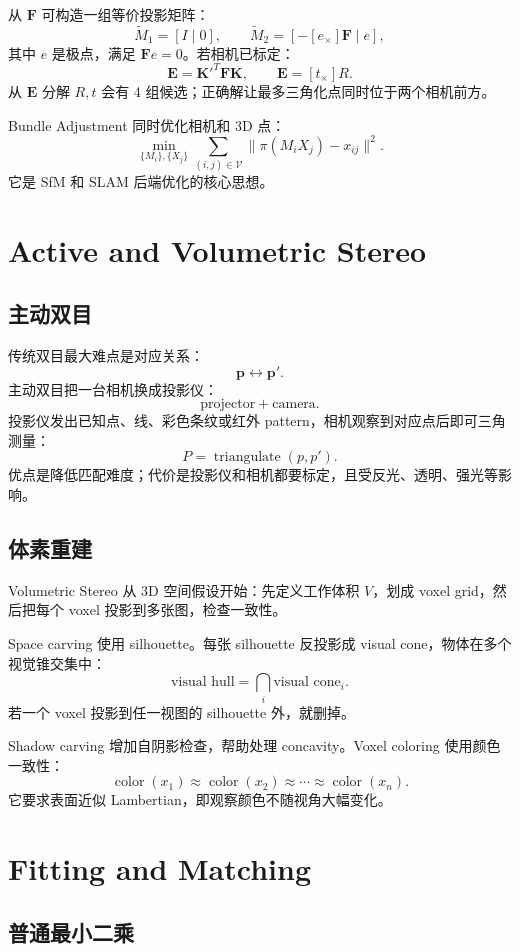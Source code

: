 \documentclass[11pt]{article}
\newcommand{\K}{\mathbf{K}}
\newcommand{\E}{\mathbf{E}}
\newcommand{\F}{\mathbf{F}}
\newcommand{\p}{\mathbf{p}}
\begin{document}
从 $\F$ 可构造一组等价投影矩阵：
\[
  \tilde M_1=[I\mid0],\qquad
  \tilde M_2=[-[e_\times]\F\mid e],
\]
其中 $e$ 是极点，满足 $\F e=0$。若相机已标定：
\[
  \E=\K'^T\F\K,\qquad
  \E=[t_\times]R.
\]
从 $\E$ 分解 $R,t$ 会有 4 组候选；正确解让最多三角化点同时位于两个相机前方。

Bundle Adjustment 同时优化相机和 3D 点：
\[
  \min_{\{M_i\},\{X_j\}}
  \sum_{(i,j)\in\mathcal V}
  \|\pi(M_iX_j)-x_{ij}\|^2.
\]
它是 SfM 和 SLAM 后端优化的核心思想。

\section{Active and Volumetric Stereo}

\subsection{主动双目}

传统双目最大难点是对应关系：
\[
  \p\leftrightarrow\p'.
\]
主动双目把一台相机换成投影仪：
\[
  \text{projector}+\text{camera}.
\]
投影仪发出已知点、线、彩色条纹或红外 pattern，相机观察到对应点后即可三角测量：
\[
  P=\operatorname{triangulate}(p,p').
\]
优点是降低匹配难度；代价是投影仪和相机都要标定，且受反光、透明、强光等影响。

\subsection{体素重建}

Volumetric Stereo 从 3D 空间假设开始：先定义工作体积 $V$，划成 voxel grid，然后把每个 voxel 投影到多张图，检查一致性。

Space carving 使用 silhouette。每张 silhouette 反投影成 visual cone，物体在多个视觉锥交集中：
\[
  \text{visual hull}=\bigcap_i \text{visual cone}_i.
\]
若一个 voxel 投影到任一视图的 silhouette 外，就删掉。

Shadow carving 增加自阴影检查，帮助处理 concavity。Voxel coloring 使用颜色一致性：
\[
  \operatorname{color}(x_1)\approx \operatorname{color}(x_2)\approx\cdots\approx \operatorname{color}(x_n).
\]
它要求表面近似 Lambertian，即观察颜色不随视角大幅变化。

\section{Fitting and Matching}

\subsection{普通最小二乘}
\end{document}
